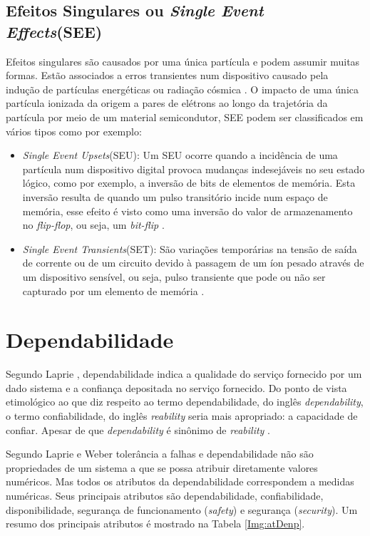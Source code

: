 \subsection{Efeitos Singulares ou \textit{Single Event Effects}(SEE)} \label{subsec:EfeitosSingulares}

Efeitos singulares são causados por uma única partícula e podem assumir muitas formas. Estão associados a erros transientes num dispositivo causado pela indução de partículas energéticas ou radiação cósmica \cite{Yu:2008}. O impacto de uma única partícula ionizada da origem a pares de elétrons ao longo da trajetória da partícula por meio de um material semicondutor, SEE podem ser classificados em vários tipos como por exemplo:

\begin{itemize}
	\item \textit{Single Event Upsets}(SEU): Um SEU ocorre quando a incidência de uma partícula num dispositivo digital provoca mudanças indesejáveis no seu estado lógico, como por exemplo, a inversão de bits de elementos de memória. Esta inversão resulta de quando um pulso transitório incide num espaço de memória, esse efeito é visto como uma inversão do valor de armazenamento no \textit{flip-flop}, ou seja, um \textit{bit-flip} \cite{Normand:1996}.
	
	\item \textit{Single Event Transients}(SET): São variações temporárias na tensão de saída de corrente ou de um circuito
	devido à passagem de um íon pesado através de um dispositivo sensível, ou seja, pulso transiente que pode ou não ser capturado por um elemento de memória \cite{Ecoffet:1994}.
\end{itemize}

\section{Dependabilidade} \label{sec:denpendabilidade}

Segundo Laprie \cite{LaprieAcidente:1990}, dependabilidade indica a qualidade do serviço fornecido por um dado sistema e a confiança depositada no serviço fornecido. Do ponto de vista etimológico ao que diz respeito ao termo dependabilidade, do inglês \textit{dependability}, o termo confiabilidade, do inglês \textit{reability} seria mais apropriado: a capacidade de confiar. Apesar de que \textit{dependability} é sinônimo de \textit{reability} \cite{LaprieAcidente:1990}. 

Segundo Laprie e Weber \cite{LaprieAcidente:1990, Weber:2002} tolerância a falhas e dependabilidade não são propriedades de um sistema a que se possa atribuir diretamente valores numéricos. Mas todos os atributos da dependabilidade correspondem a medidas numéricas. Seus principais atributos são dependabilidade, confiabilidade, disponibilidade, segurança de funcionamento (\textit{safety}) e segurança (\textit{security}). Um resumo dos principais
atributos é mostrado na Tabela \ref{Img:atDenp}.     


